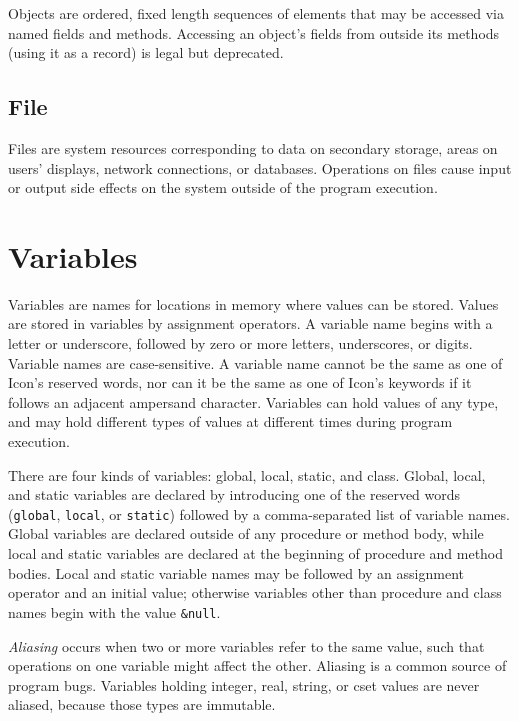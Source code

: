Objects are ordered, fixed length sequences of elements that may
be accessed via named fields and methods. Accessing an object's fields from
outside its methods (using it as a record) is legal but deprecated.

\subsection*{File}

Files are system resources corresponding to data on secondary
storage, areas on users' displays, network connections, or
databases. Operations on files cause input or output side
effects on the system outside of the program execution.

\section{Variables}

Variables are names for locations in memory where values can be stored.
Values are stored in variables by assignment
operators. A variable name begins with a letter or
underscore, followed by zero or more letters, underscores, or digits.
Variable names are case-sensitive.
A variable name cannot be the same as one of Icon's
reserved words, nor can it be the same as one of
Icon's keywords if it follows an adjacent ampersand
character. Variables can hold values of any type, and may hold
different types of values at different times during program execution.

There are four kinds of variables: global,
local, static, and class. Global,
local, and static variables are declared by introducing one of the
reserved words (\texttt{global}, \texttt{local}, or \texttt{static})
followed by a comma-separated list of variable names. Global variables
are declared outside of any procedure or method body, while local and
static variables are declared at the beginning of procedure and method
bodies. Local and static variable names may be followed by
an assignment operator and an initial value; otherwise variables
other than procedure and class names begin with the value
\texttt{\&null}.

\textit{Aliasing} occurs when two or more variables
refer to the same value, such that operations on one variable might
affect the other. Aliasing is a common source of program bugs.
Variables holding integer, real, string, or cset values are never
aliased, because those types are immutable.

